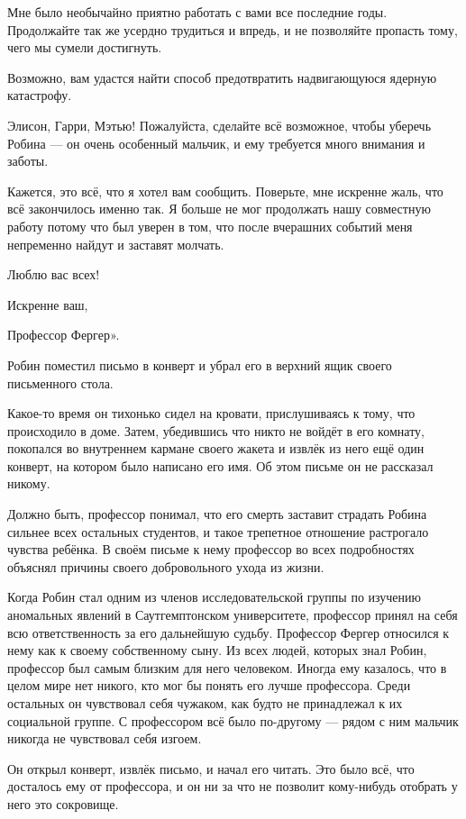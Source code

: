 \documentclass[a5paper, 9pt,
final, openany, twoside=true]{memoir}
\begin{document}
Мне было необычайно приятно работать с вами все последние годы. Продолжайте так же усердно трудиться и впредь, и не позволяйте пропасть тому, чего мы сумели достигнуть.

Возможно, вам удастся найти способ предотвратить надвигающуюся ядерную катастрофу.

Элисон, Гарри, Мэтью! Пожалуйста, сделайте всё возможное, чтобы уберечь Робина — он очень особенный мальчик, и ему требуется много внимания и заботы.

Кажется, это всё, что я хотел вам сообщить. Поверьте, мне искренне жаль, что всё закончилось именно так. Я больше не мог продолжать нашу совместную работу потому что был уверен в том, что после вчерашних событий меня непременно найдут и заставят молчать.\bigskip

Люблю вас всех!\bigskip

Искренне ваш,\bigskip

Профессор Фергер».\bigskip

Робин поместил письмо в конверт и убрал его в верхний ящик своего письменного стола.

Какое-то время он тихонько сидел на кровати, прислушиваясь к тому, что происходило в доме. Затем, убедившись что никто не войдёт в его комнату, покопался во внутреннем кармане своего жакета и извлёк из него ещё один конверт, на котором было написано его имя. Об этом письме он не рассказал никому.

Должно быть, профессор понимал, что его смерть заставит страдать Робина сильнее всех остальных студентов, и такое трепетное отношение растрогало чувства ребёнка. В своём письме к нему профессор во всех подробностях объяснял причины своего добровольного ухода из жизни.

Когда Робин стал одним из членов исследовательской группы по изучению аномальных явлений в Саутгемптонском университете, профессор принял на себя всю ответственность за его дальнейшую судьбу. Профессор Фергер относился к нему как к своему собственному сыну. Из всех людей, которых знал Робин, профессор был самым близким для него человеком. Иногда ему казалось, что в целом мире нет никого, кто мог бы понять его лучше профессора. Среди остальных он чувствовал себя чужаком, как будто не принадлежал к их социальной группе. С профессором всё было по-другому — рядом с ним мальчик никогда не чувствовал себя изгоем.

Он открыл конверт, извлёк письмо, и начал его читать. Это было всё, что досталось ему от профессора, и он ни за что не позволит кому-нибудь отобрать у него это сокровище.\bigskip
\end{document}
